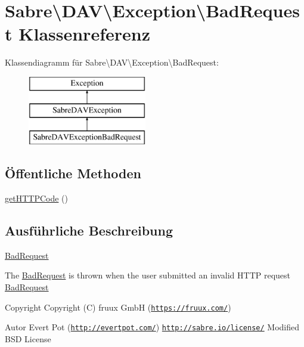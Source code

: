 \hypertarget{class_sabre_1_1_d_a_v_1_1_exception_1_1_bad_request}{}\section{Sabre\textbackslash{}D\+AV\textbackslash{}Exception\textbackslash{}Bad\+Request Klassenreferenz}
\label{class_sabre_1_1_d_a_v_1_1_exception_1_1_bad_request}
Klassendiagramm für Sabre\textbackslash{}D\+AV\textbackslash{}Exception\textbackslash{}Bad\+Request\+:\begin{figure}[H]
\begin{center}
\leavevmode
\includegraphics[height=3.000000cm]{class_sabre_1_1_d_a_v_1_1_exception_1_1_bad_request}
\end{center}
\end{figure}
\subsection*{Öffentliche Methoden}
\begin{DoxyCompactItemize}
\item 
\mbox{\hyperlink{class_sabre_1_1_d_a_v_1_1_exception_1_1_bad_request_a9ee979b5f57c7a1bf5fef26ed0e3e677}{get\+H\+T\+T\+P\+Code}} ()
\end{DoxyCompactItemize}


\subsection{Ausführliche Beschreibung}
\mbox{\hyperlink{class_sabre_1_1_d_a_v_1_1_exception_1_1_bad_request}{Bad\+Request}}

The \mbox{\hyperlink{class_sabre_1_1_d_a_v_1_1_exception_1_1_bad_request}{Bad\+Request}} is thrown when the user submitted an invalid H\+T\+TP request \mbox{\hyperlink{class_sabre_1_1_d_a_v_1_1_exception_1_1_bad_request}{Bad\+Request}}

\begin{DoxyCopyright}{Copyright}
Copyright (C) fruux GmbH (\href{https://fruux.com/}{\tt https\+://fruux.\+com/}) 
\end{DoxyCopyright}
\begin{DoxyAuthor}{Autor}
Evert Pot (\href{http://evertpot.com/}{\tt http\+://evertpot.\+com/})  \href{http://sabre.io/license/}{\tt http\+://sabre.\+io/license/} Modified B\+SD License 
\end{DoxyAuthor}


